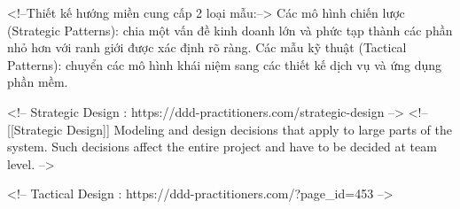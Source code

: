 
<!--Thiết kế hướng miền cung cấp 2 loại mẫu:-->
Các mô hình chiến lược (Strategic Patterns): chia một vấn đề kinh doanh lớn và phức tạp thành các phần nhỏ hơn với ranh giới được xác định rõ ràng.
Các mẫu kỹ thuật (Tactical Patterns): chuyển các mô hình khái niệm sang các thiết kế dịch vụ và ứng dụng phần mềm.




<!-- Strategic Design : https://ddd-practitioners.com/strategic-design -->
<!-- [[Strategic Design]] Modeling and design decisions that apply to large parts of the system. Such decisions affect the entire project and have to be decided at team level. -->

<!-- Tactical Design : https://ddd-practitioners.com/?page_id=453 -->



